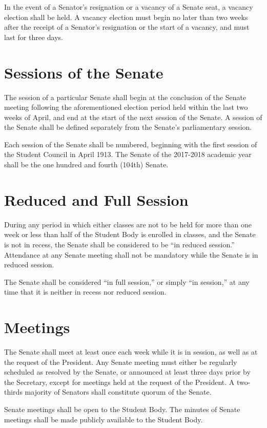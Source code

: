 \documentclass[12pt,oneside]{scrreprt}
\begin{document}
In the event of a Senator's resignation or a vacancy of a Senate seat, a vacancy election shall be held. A vacancy election must begin no later than two weeks after the receipt of a Senator's resignation or the start of a vacancy, and must last for three days.

\section{Sessions of the Senate}
The session of a particular Senate shall begin at the conclusion of the Senate meeting following the aforementioned election period held within the last two weeks of April, and end at the start of the next session of the Senate. A session of the Senate shall be defined separately from the Senate's parliamentary session.

Each session of the Senate shall be numbered, beginning with the first session of the Student Council in April 1913. The Senate of the 2017-2018 academic year shall be the one hundred and fourth (104th) Senate.

\section{Reduced and Full Session}
During any period in which either classes are not to be held for more than one week or less than half of the Student Body is enrolled in classes, and the Senate is not in recess, the Senate shall be considered to be ``in reduced session.'' Attendance at any Senate meeting shall not be mandatory while the Senate is in reduced session.

The Senate shall be considered ``in full session,'' or simply ``in session,'' at any time that it is neither in recess nor reduced session.

\section{Meetings}
The Senate shall meet at least once each week while it is in session, as well as at the request of the President. Any Senate meeting must either be regularly scheduled as resolved by the Senate, or announced at least three days prior by the Secretary, except for meetings held at the request of the President. A two-thirds majority of Senators shall constitute quorum of the Senate.

Senate meetings shall be open to the Student Body. The minutes of Senate meetings shall be made publicly available to the Student Body.
\end{document}
